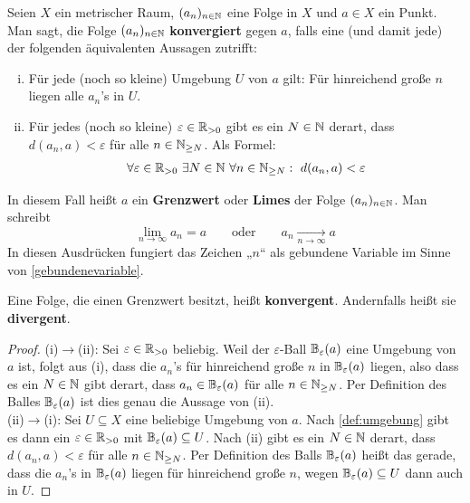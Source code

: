 \begin{defin}[Folgenkonvergenz] \label{def:konvergenz}    
    Seien $X$ ein metrischer Raum, $(a_n)_{n\in \mathbb N}$ eine Folge in $X$ und $a\in X$ ein Punkt. Man sagt, die Folge $(a_n)_{n\in \mathbb N}$ \textbf{konvergiert} gegen $a$, falls eine (und damit jede) der folgenden äquivalenten Aussagen zutrifft:
    \begin{enumerate}[(i)]
        \item Für jede (noch so kleine) Umgebung $U$ von $a$ gilt: Für hinreichend große $n$ liegen alle $a_n$'s in $U$.
        \item Für jedes (noch so kleine) $\varepsilon \in \mathbb R_{>0}$ gibt es ein $N\in \mathbb N$ derart, dass $d(a_n,a)<\varepsilon$ für alle $n\in \mathbb N_{\ge N}$. Als Formel:
        \begin{align*}
            \forall\varepsilon\in \mathbb R_{>0}\ \exists N\in\mathbb N\ \forall n\in \mathbb N_{\ge N}:\ d(a_n,a)<\varepsilon
        \end{align*}
    \end{enumerate}
    In diesem Fall heißt $a$ ein \textbf{Grenzwert} oder \textbf{Limes} der Folge $(a_n)_{n\in \mathbb N}$. Man schreibt
        \[ \lim_{n\to\infty}a_n=a \qquad\text{oder}\qquad a_n\xrightarrow[n\to \infty]{} a \]
    In diesen Ausdrücken fungiert das Zeichen „$n$“ als gebundene Variable im Sinne von \cref{gebundenevariable}.

    Eine Folge, die einen Grenzwert besitzt, heißt \textbf{konvergent}. Andernfalls heißt sie \textbf{divergent}.
\end{defin}
\begin{proof}
    (i)$\to$(ii): Sei $\varepsilon\in \mathbb R_{> 0}$ beliebig. Weil der $\varepsilon$-Ball $\mathbb B_\varepsilon(a)$ eine Umgebung von $a$ ist, folgt aus (i), dass die $a_n$'s für hinreichend große $n$ in $\mathbb B_\varepsilon(a)$ liegen, also dass es ein $N\in \mathbb N$ gibt derart, dass $a_n\in \mathbb B_\varepsilon(a)$ für alle $n\in \mathbb N_{\ge N}$. Per Definition des Balles $\mathbb B_\varepsilon(a)$ ist dies genau die Aussage von (ii). \\[0.5em]
    (ii)$\to$(i): Sei $U\subseteq X$ eine beliebige Umgebung von $a$. Nach \cref{def:umgebung} gibt es dann ein $\varepsilon\in \mathbb R_{>0}$ mit $\mathbb B_\varepsilon(a)\subseteq U$. Nach (ii) gibt es ein $N\in \mathbb N$ derart, dass $d(a_n,a)<\varepsilon$ für alle $n\in \mathbb N_{\ge N}$. Per Definition des Balls $\mathbb B_\varepsilon(a)$ heißt das gerade, dass die $a_n$'s in $\mathbb B_\varepsilon(a)$ liegen für hinreichend große $n$, wegen $\mathbb B_\varepsilon(a)\subseteq U$ dann auch in $U$.
\end{proof}


